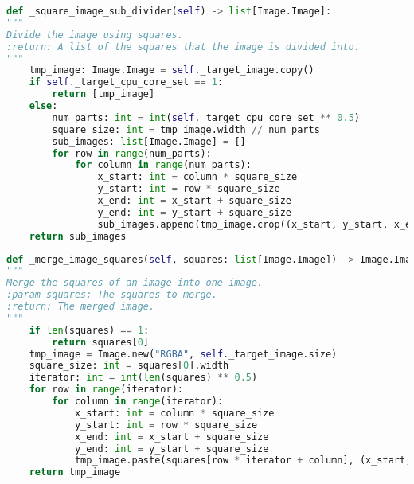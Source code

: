 {{\begin{lstlisting}[language=Python, caption={Codice per la suddivisione in quadrati}, label={appendix:square_subdivision}]
def _square_image_sub_divider(self) -> list[Image.Image]:
"""
Divide the image using squares.
:return: A list of the squares that the image is divided into.
"""
	tmp_image: Image.Image = self._target_image.copy()
	if self._target_cpu_core_set == 1:
		return [tmp_image]
	else:
		num_parts: int = int(self._target_cpu_core_set ** 0.5)
		square_size: int = tmp_image.width // num_parts
		sub_images: list[Image.Image] = []
		for row in range(num_parts):
			for column in range(num_parts):
				x_start: int = column * square_size
				y_start: int = row * square_size
				x_end: int = x_start + square_size
				y_end: int = y_start + square_size
				sub_images.append(tmp_image.crop((x_start, y_start, x_end, y_end)))
	return sub_images
\end{lstlisting}}

{\begin{lstlisting}[language=Python, caption={Codice per l'unione dei quadrati}, label={appendix:squares_merge}]
def _merge_image_squares(self, squares: list[Image.Image]) -> Image.Image:
"""
Merge the squares of an image into one image.
:param squares: The squares to merge.
:return: The merged image.
"""
	if len(squares) == 1:
		return squares[0]
	tmp_image = Image.new("RGBA", self._target_image.size)
	square_size: int = squares[0].width
	iterator: int = int(len(squares) ** 0.5)
	for row in range(iterator):
		for column in range(iterator):
			x_start: int = column * square_size
			y_start: int = row * square_size
			x_end: int = x_start + square_size
			y_end: int = y_start + square_size
			tmp_image.paste(squares[row * iterator + column], (x_start, y_start, x_end, y_end))
	return tmp_image
\end{lstlisting}}
\newpage
}
